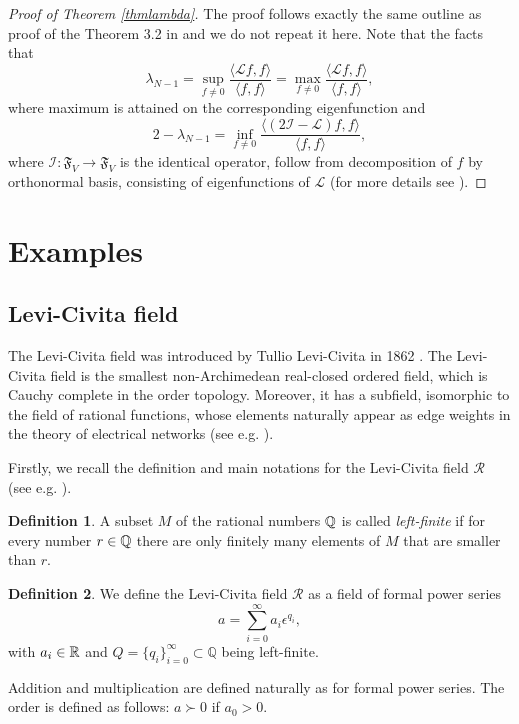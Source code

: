 \documentclass[a4paper,12pt]{amsart}
\theoremstyle{definition}
\newtheorem{definition}{Definition}
\renewcommand{\L}{\mathcal{L}}
\newcommand{\F}{\mathfrak{F}}
\begin{document}
\begin{proof}[Proof of Theorem \ref{thmlambda}]
The proof follows exactly the same outline as proof of the Theorem 3.2 in \cite{BauerJost} and we do not repeat it here. 
Note that the facts that 
$$
\lambda_{N-1}=\sup_{f\ne 0}\dfrac{\langle \L f,f\rangle}{\langle f,f\rangle}=\max_{f\ne 0}\dfrac{\langle \L f,f\rangle}{\langle f,f\rangle},
$$ 
where maximum is attained on the corresponding eigenfunction and
$$
2-\lambda_{N-1}=\inf_{f\ne 0}\dfrac{\langle (2\mathcal I-\L) f,f\rangle}{\langle f,f\rangle}, 
$$ 
where $\mathcal I:\F_V\rightarrow \F_V$ is the identical operator, follow from decomposition of $f$ by orthonormal basis, consisting of eigenfunctions of $\L$ (for more details see \cite{MuranovaPreprint22}).

\end{proof}

\section{Examples}\label{LC}
\subsection{Levi-Civita field}
The Levi-Civita field was  introduced by Tullio Levi-Civita in 1862 \cite{LeviCivita}.
The Levi-Civita field is the smallest non-Archimedean real-closed ordered field, which is Cauchy complete in the order topology. Moreover, it has a subfield, isomorphic to the field of rational functions, whose elements naturally appear as edge weights in the theory of electrical networks (see e.g. \cite{Muranova1, Muranova2}).

Firstly, we recall the definition and main notations for the Levi-Civita field $\mathcal R$ (see e.g. \cite{Berz, Hall, Shamseddine, Shamseddinethesis, ShamseddineBerz}).

\begin{definition}
A subset $M$ of the rational numbers $\Bbb Q$ is called \emph{left-finite} if for every number $r\in \Bbb Q$ there are only finitely many elements of $M$ that are smaller than $r$. 
\end{definition}




\begin{definition}\cite{LeviCivita}\label{LCfield}
We define the Levi-Civita field $\mathcal R$ as a field of formal power series
\begin{equation}
a=\sum_{i=0}^\infty a_i\epsilon^{q_i},
\end{equation}
with $a_i\in \Bbb R$ and $Q=\{q_i\}_{i=0}^\infty\subset \mathbb Q$ being left-finite.
\end{definition}
Addition and multiplication are defined naturally as for formal power series. The order is defined as follows: $a\succ 0$ if $a_0>0$.
 
\end{document}
